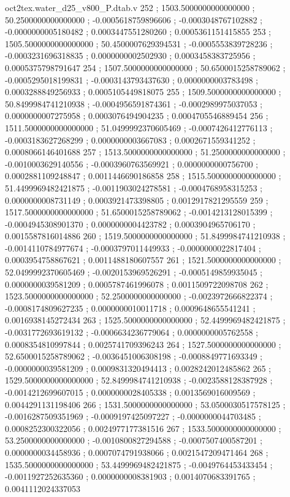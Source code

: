 \begin{filecontents}[overwrite]{oct2tex.water_d25_v800_P.dtab.v}
252 ; 1503.5000000000000000 ; 50.2500000000000000 ; -0.0005618759896606 ; -0.0003048767102882 ; -0.0000000005180482 ; 0.0003447551280260 ; 0.0005361151415855
253 ; 1505.5000000000000000 ; 50.4500007629394531 ; -0.0005553839728236 ; -0.0003231696318835 ; 0.0000000002502930 ; 0.0003458383725956 ; 0.0005375798791647
254 ; 1507.5000000000000000 ; 50.6500015258789062 ; -0.0005295018199831 ; -0.0003143793437630 ; 0.0000000003783498 ; 0.0003288849256933 ; 0.0005105449818075
255 ; 1509.5000000000000000 ; 50.8499984741210938 ; -0.0004956591874361 ; -0.0002989975037053 ; 0.0000000007275958 ; 0.0003076494904235 ; 0.0004705546889454
256 ; 1511.5000000000000000 ; 51.0499992370605469 ; -0.0007426412776113 ; -0.0003183627268299 ; 0.0000000003667083 ; 0.0002671559341252 ; 0.0008066146401688
257 ; 1513.5000000000000000 ; 51.2500000000000000 ; -0.0010003629140556 ; -0.0003960763569921 ; 0.0000000000756700 ; 0.0002881109248847 ; 0.0011446690186858
258 ; 1515.5000000000000000 ; 51.4499969482421875 ; -0.0011903024278581 ; -0.0004768958315253 ; 0.0000000008731149 ; 0.0003921473398805 ; 0.0012917821295559
259 ; 1517.5000000000000000 ; 51.6500015258789062 ; -0.0014213128015399 ; -0.0004945308901370 ; 0.0000000004423782 ; 0.0003904965706170 ; 0.0015587816014886
260 ; 1519.5000000000000000 ; 51.8499984741210938 ; -0.0014110784977674 ; -0.0003797011449933 ; -0.0000000022817404 ; 0.0003954758867621 ; 0.0011488180607557
261 ; 1521.5000000000000000 ; 52.0499992370605469 ; -0.0020153969526291 ; -0.0005149859935045 ; 0.0000000039581209 ; 0.0005787461996078 ; 0.0011509722098708
262 ; 1523.5000000000000000 ; 52.2500000000000000 ; -0.0023972666822374 ; -0.0008174809627235 ; 0.0000000010011718 ; 0.0009648655541241 ; 0.0016938145272434
263 ; 1525.5000000000000000 ; 52.4499969482421875 ; -0.0031772693619132 ; -0.0006634236779064 ; 0.0000000005762558 ; 0.0008354810997844 ; 0.0025741709396243
264 ; 1527.5000000000000000 ; 52.6500015258789062 ; -0.0036451006308198 ; -0.0008849771693349 ; -0.0000000039581209 ; 0.0009831320494413 ; 0.0028242012485862
265 ; 1529.5000000000000000 ; 52.8499984741210938 ; -0.0023588128387928 ; -0.0014212699607015 ; 0.0000000028405338 ; 0.0013569016009569 ; 0.0044291131198406
266 ; 1531.5000000000000000 ; 53.0500030517578125 ; -0.0016287509351969 ; -0.0009197425097227 ; -0.0000000044703485 ; 0.0008252300322056 ; 0.0024977177381516
267 ; 1533.5000000000000000 ; 53.2500000000000000 ; -0.0010800827294588 ; -0.0007507400587201 ; 0.0000000034458936 ; 0.0007074791938066 ; 0.0021547209471464
268 ; 1535.5000000000000000 ; 53.4499969482421875 ; -0.0049764453433454 ; -0.0011927252635360 ; 0.0000000008381903 ; 0.0014070683391765 ; 0.0041112024337053

\end{filecontents}
